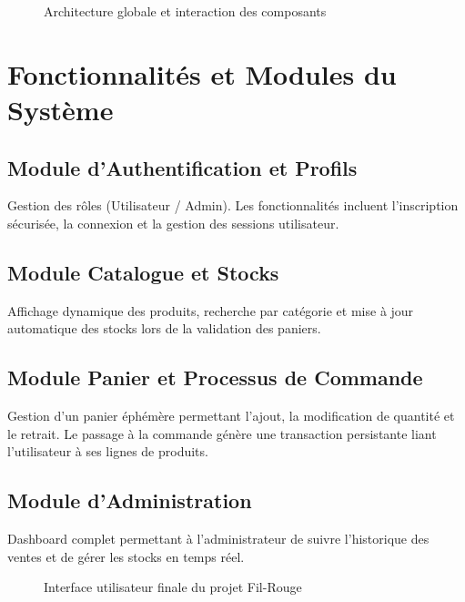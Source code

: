 \documentclass[12pt,a4paper]{report}
\begin{document}
\begin{figure}[h]
    \centering
    \caption{Architecture globale et interaction des composants}
\end{figure}

\chapter{Fonctionnalités et Modules du Système}

\section{Module d'Authentification et Profils}
Gestion des rôles (Utilisateur / Admin). Les fonctionnalités incluent l'inscription sécurisée, la connexion et la gestion des sessions utilisateur.

\section{Module Catalogue et Stocks}
Affichage dynamique des produits, recherche par catégorie et mise à jour automatique des stocks lors de la validation des paniers.

\section{Module Panier et Processus de Commande}
Gestion d'un panier éphémère permettant l'ajout, la modification de quantité et le retrait. Le passage à la commande génère une transaction persistante liant l'utilisateur à ses lignes de produits.

\section{Module d'Administration}
Dashboard complet permettant à l'administrateur de suivre l'historique des ventes et de gérer les stocks en temps réel.

\begin{figure}[h]
    \centering
    \caption{Interface utilisateur finale du projet Fil-Rouge}
\end{figure}
\end{document}
